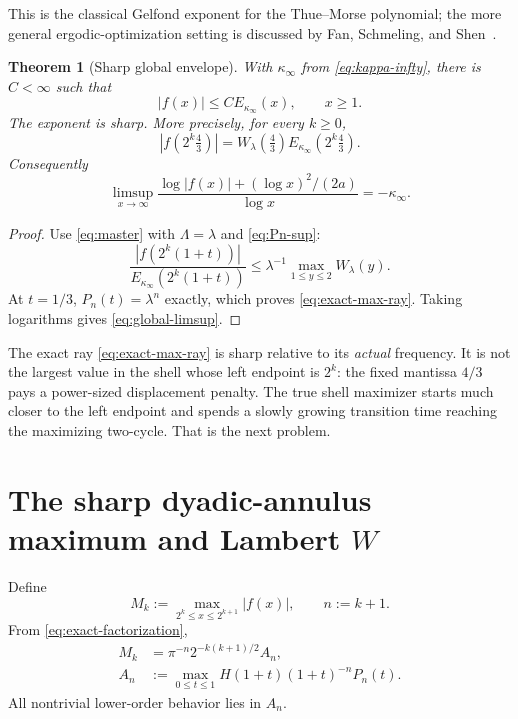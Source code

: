 \documentclass[11pt,oneside]{article}
\newtheorem{theorem}{Theorem}[section]
\theoremstyle{definition}
\theoremstyle{remark}
\begin{document}
This is the classical Gelfond exponent for the Thue--Morse polynomial; the
more general ergodic-optimization setting is discussed by Fan, Schmeling, and
Shen~\cite{fanschmeling}.

\begin{theorem}[Sharp global envelope]
\label{thm:uniform-envelope}
With $\kappa_\infty$ from \eqref{eq:kappa-infty}, there is $C<\infty$ such
that
\begin{equation}
 |f(x)|\le C E_{\kappa_\infty}(x),
 \qquad x\ge1.
 \label{eq:uniform-envelope}
\end{equation}
The exponent is sharp.  More precisely, for every $k\ge0$,
\begin{equation}
 |f(2^k\tfrac43)|
 =W_\lambda(\tfrac43)E_{\kappa_\infty}(2^k\tfrac43).
 \label{eq:exact-max-ray}
\end{equation}
Consequently
\begin{equation}
 \limsup_{x\to\infty}
 \frac{\log|f(x)|+(\log x)^2/(2a)}{\log x}
 =-\kappa_\infty.
 \label{eq:global-limsup}
\end{equation}
\end{theorem}

\begin{proof}
Use \eqref{eq:master} with $\Lambda=\lambda$ and
\eqref{eq:Pn-sup}:
\[
 \frac{|f(2^k(1+t))|}{E_{\kappa_\infty}(2^k(1+t))}
 \le\lambda^{-1}\max_{1\le y\le2}W_\lambda(y).
\]
At $t=1/3$, $P_n(t)=\lambda^n$ exactly, which proves
\eqref{eq:exact-max-ray}.  Taking logarithms gives
\eqref{eq:global-limsup}.
\end{proof}

The exact ray \eqref{eq:exact-max-ray} is sharp relative to its \emph{actual}
frequency.  It is not the largest value in the shell whose left endpoint is
$2^k$: the fixed mantissa $4/3$ pays a power-sized displacement penalty.  The
true shell maximizer starts much closer to the left endpoint and spends a
slowly growing transition time reaching the maximizing two-cycle.  That is the
next problem.

\section{The sharp dyadic-annulus maximum and Lambert \texorpdfstring{$W$}{W}}
\label{sec:annular}

Define
\begin{equation}
 M_k:=\max_{2^k\le x\le2^{k+1}}|f(x)|,
 \qquad n:=k+1.
 \label{eq:Mk}
\end{equation}
From \eqref{eq:exact-factorization},
\begin{align}
 M_k&=\pi^{-n}2^{-k(k+1)/2}A_n,
 \label{eq:Mk-An}\\
 A_n&:=\max_{0\le t\le1}
 H(1+t)(1+t)^{-n}P_n(t).
 \label{eq:An}
\end{align}
All nontrivial lower-order behavior lies in $A_n$.
\end{document}
